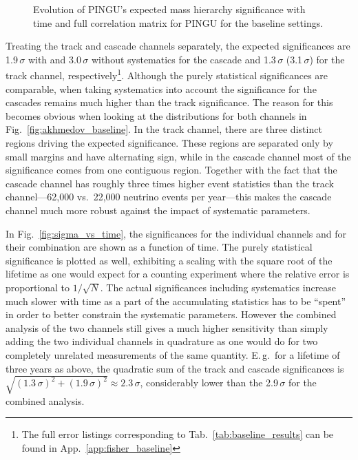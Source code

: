 \begin{figure}[thp]
 \centering
 \caption{\protect{} Evolution of PINGU's expected mass 
          hierarchy significance with time and 
          \protect{} full correlation matrix for PINGU
          for the baseline settings.}
 \label{fig:time_covmat}
\end{figure}

Treating the track and cascade channels separately, the expected significances
are 1.9\,$\sigma$ with and 3.0\,$\sigma$ without systematics for the cascade
and 1.3\,$\sigma$ (3.1\,$\sigma$) for the track channel,
respectively\footnote{The full error listings corresponding to
Tab.~\ref{tab:baseline_results} can be found in
App.~\ref{app:fisher_baseline}}. Although the purely statistical significances
are comparable, when taking systematics into account the significance for the
cascades remains much higher than the track significance. 
The reason for this becomes obvious when looking at the \delchi distributions 
for both channels in Fig.~\ref{fig:akhmedov_baseline}. In the track channel, 
there are three distinct regions driving the expected significance. These 
regions are separated only by small margins and have alternating sign, while in 
the cascade channel most of the significance comes from one contiguous region. 
Together with the fact that the cascade channel has roughly three times higher 
event statistics than the track channel---62,000 vs.\ 22,000 neutrino events 
per year---this makes the cascade channel much more robust against the impact 
of systematic parameters.

In Fig.~\ref{fig:sigma_vs_time}, the significances for the individual channels 
and for their combination are shown as a function of time. The purely 
statistical significance is plotted as well, exhibiting a scaling with the 
square root of the lifetime as one would expect for a counting experiment where 
the relative error is proportional to $1/\sqrt{N}$. The actual significances 
including systematics increase much slower with time as a part of the 
accumulating statistics has to be ``spent'' in order to better constrain the 
systematic parameters. However the combined analysis of the two channels still 
gives a much higher sensitivity than simply adding the two individual channels 
in quadrature as one would do for two completely unrelated measurements of the 
same quantity. E.\,g.\ for a lifetime of three years as above, the quadratic 
sum of the track and cascade significances is $\sqrt{(1.3\,\sigma)^2 + 
(1.9\,\sigma)^2} \approx 2.3\,\sigma$, considerably lower than the 
2.9\,$\sigma$ for the combined analysis.

